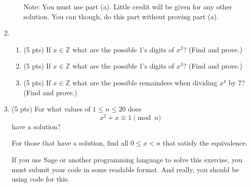 \documentclass[12pt]{article}
\newcommand{\Z}{\mathbb{Z}}
\begin{document}
\begin{enumerate}
\begin{enumerate}
				Note: You must use part (a).  Little credit will be given for any other solution. You can though, do this part without proving part (a).
				\vfill
		\end{enumerate} 
	\newpage
	\item \begin{enumerate}
		\item (5 pts) If $x\in\Z$ what are the possible 1's digits of $x^2$? (Find and prove.)\vfill
		\item (5 pts) If $x\in\Z$ what are the possible 1's digits of $x^3$? (Find and prove.)\vfill
		\item (5 pts) If $x\in\Z$ what are the possible remainders when dividing $x^4$ by 7? (Find and prove.)\vfill
	\end{enumerate}
	\newpage
	\item (5 pts) For what values of $1\leq n\leq 20$ does
		$$x^2+x\equiv 1\pmod n$$
		have a solution?
		
		For those that have a solution, find all $0\leq x<n$ that satisfy the equivalence.
		
		If you use Sage or another programming language to solve this exercise, you must submit your code in some readable format. And really, you should be using code for this.
	\end{enumerate}
\end{document}

